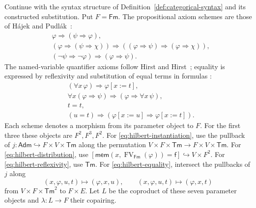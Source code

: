 \documentclass[11pt]{article}
\theoremstyle{definition}\newtheorem{definition}[theorem]{Definition}
\newcommand{\Tm}{\mathsf{Tm}}
\newcommand{\Fm}{\mathsf{Fm}}
\newcommand{\FV}{\operatorname{FV}}
\newcommand{\Adm}{\mathsf{Adm}}
\newcommand{\mem}{\mathsf{mem}}
\begin{document}
Continue with the syntax structure of
Definition~\ref{def:categorical-syntax} and its constructed substitution.
Put $F=\Fm$. The propositional axiom schemes are those of
H\'ajek and Pudl\'ak~\cite[Section 0.10]{HP}:
\begin{align}
 &\varphi\Rightarrow(\psi\Rightarrow\varphi),
                                                        \label{eq:hilbert-one}\\
 &(\varphi\Rightarrow(\psi\Rightarrow\chi))
   \Rightarrow((\varphi\Rightarrow\psi)
   \Rightarrow(\varphi\Rightarrow\chi)),
                                                        \label{eq:hilbert-two}\\
 &(\neg\psi\Rightarrow\neg\varphi)
   \Rightarrow(\varphi\Rightarrow\psi).
                                                        \label{eq:hilbert-three}
\end{align}
The named-variable quantifier axioms follow
Hirst and Hirst~\cite[Sections 2.11--2.12]{HH}; equality is expressed
by reflexivity and substitution of equal terms in formulas
\cite[Section 3.1]{HH}:
\begin{align}
 &(\forall x\,\varphi)\Rightarrow\varphi[x:=t],
                                                        \label{eq:hilbert-instantiation}\\
 &\forall x(\varphi\Rightarrow\psi)
       \Rightarrow(\varphi\Rightarrow\forall x\,\psi),
                                                        \label{eq:hilbert-distribution}\\
 &t=t,                                                   \label{eq:hilbert-reflexivity}\\
 &(u=t)\Rightarrow
       (\varphi[x:=u]\Rightarrow\varphi[x:=t]).           \label{eq:hilbert-equality}
\end{align}
Each scheme denotes a morphism from its parameter object to $F$.
For the first three these objects are $F^2,F^3,F^2$.
For \eqref{eq:hilbert-instantiation}, use the pullback of
$j:\Adm\hookrightarrow F\times V\times\Tm$ along the
permutation $V\times F\times\Tm\to F\times V\times\Tm$.
For \eqref{eq:hilbert-distribution}, use
$[\mem(x,\FV_{\Fm}(\varphi))=\mathsf f]
\hookrightarrow V\times F^2$.
For \eqref{eq:hilbert-reflexivity}, use $\Tm$.
For \eqref{eq:hilbert-equality}, intersect the pullbacks of $j$
along
\[
 (x,\varphi,u,t)\longmapsto(\varphi,x,u),\qquad
 (x,\varphi,u,t)\longmapsto(\varphi,x,t)
\]
from $V\times F\times\Tm^2$ to $F\times E$.
Let $L$ be the coproduct of these seven parameter objects and
$\lambda:L\to F$ their copairing.
\end{document}
